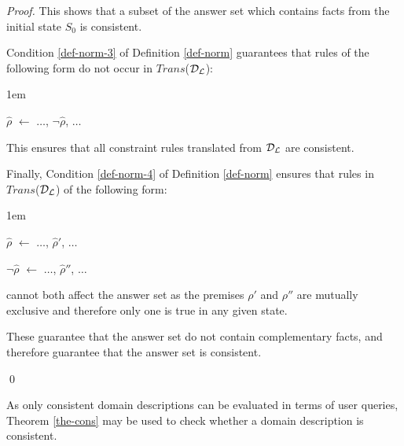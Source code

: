 \documentclass[global,twocolumn,final]{svjour}
\newenvironment{vproof}
  {\begin{proof}\hspace{0.25em}}
  {\qed\end{proof}}
\newenvironment{vquote}
  {\begin{list}{}{\leftmargin 1em}\item[]}
  {\end{list}}
\begin{document}
\begin{vproof}
      This shows that a subset of the answer set which contains facts from the
      initial state $S_{0}$ is consistent.

      Condition \ref{def-norm-3} of Definition \ref{def-norm} guarantees that
      rules of the following form do not occur in $Trans$(${\cal D}_{\cal L}$):

      \begin{vquote}
        $\hat{\rho}$ $\leftarrow$ $\hdots$, $\lnot\hat{\rho}$, $\hdots$
      \end{vquote}

      This ensures that all constraint rules translated from
      ${\cal D}_{\cal L}$ are consistent.

      Finally, Condition \ref{def-norm-4} of Definition \ref{def-norm}
      ensures that rules in $Trans$(${\cal D}_{\cal L}$) of the following form:

      \begin{vquote}
        $\hat{\rho}$ $\leftarrow$ $\hdots$, $\hat{\rho}'$, $\hdots$

        $\lnot \hat{\rho}$ $\leftarrow$ $\hdots$, $\hat{\rho}''$, $\hdots$
      \end{vquote}

      \noindent
      cannot both affect the answer set as the premises $\rho'$ and $\rho''$
      are mutually exclusive and therefore only one is true in any given state.

      These guarantee that the answer set do not contain complementary facts,
      and therefore guarantee that the answer set is consistent.

    \end{vproof}

    As only consistent domain descriptions can be evaluated in terms of user
    queries, Theorem \ref{the-cons} may be used to check whether a domain
    description is consistent.
\end{document}
